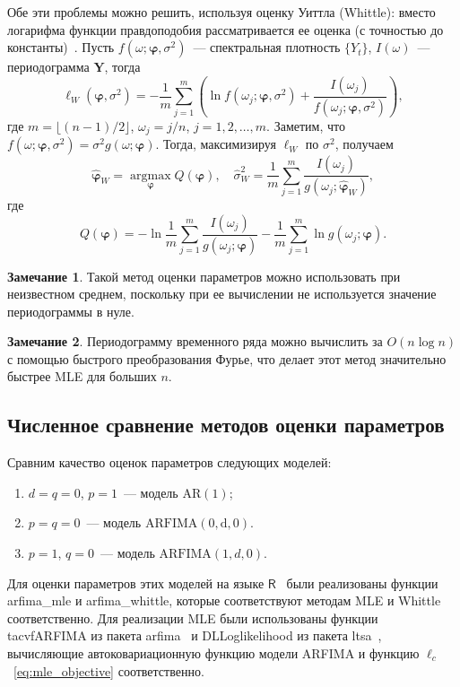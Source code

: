 \documentclass[specialist,
substylefile = spbu_report.rtx,
subf,href,colorlinks=true, 12pt]{disser}
\theoremstyle{definition}
\newtheorem{remark}{Замечание}[chapter]
\begin{document}
Обе эти проблемы можно решить, используя оценку Уиттла (Whittle): вместо логарифма функции правдоподобия рассматривается ее оценка (с точностью до константы)~\cite{Whittle1953}. Пусть $f(\omega; \bm\varphi, \sigma^2)$~--- спектральная плотность $\{Y_t\}$, $I(\omega)$~--- периодограмма $\bm Y$, тогда
\[
	\ell_W(\bm\varphi, \sigma^2)=-\frac1m\sum_{j=1}^m\left(\ln f(\omega_j; \bm\varphi, \sigma^2) + \frac{I(\omega_j)}{f(\omega_j; \bm\varphi, \sigma^2)}\right),
\]
где $m=\lfloor(n-1)/2\rfloor$, $\omega_j = j / n$, $j=1,2,\ldots,m$. Заметим, что $f(\omega; \bm\varphi, \sigma^2)=\sigma^2 g(\omega; \bm\varphi)$. Тогда, максимизируя $\ell_W$ по $\sigma^2$, получаем
\[
	\widehat{\bm\varphi}_W = \operatorname*{argmax}_{\bm\varphi}Q(\bm\varphi),\quad \widehat\sigma_W^2=\frac1m \sum_{j=1}^m\frac{I(\omega_j)}{g(\omega_j; \widehat{\bm\varphi}_W)},
\]
где
\[
	Q(\bm\varphi)=-\ln\frac1m \sum_{j=1}^m\frac{I(\omega_j)}{g(\omega_j; \bm\varphi)} - \frac1m \sum_{j=1}^m\ln g(\omega_j; \bm\varphi).
\]
\begin{remark}
	Такой метод оценки параметров можно использовать при неизвестном среднем, поскольку при ее вычислении не используется значение периодограммы в нуле.
\end{remark}
\begin{remark}
	Периодограмму временного ряда можно вычислить за $O(n\log n)$ с помощью быстрого преобразования Фурье, что делает этот метод значительно быстрее MLE для больших $n$.
\end{remark}
\subsection{Численное сравнение методов оценки параметров}\label{sect:est_param}
Сравним качество оценок параметров следующих моделей:
\begin{enumerate}
	\item $d=q=0$, $p=1$~--- модель $\mathrm{AR}(1)$;
	\item $p=q=0$~--- модель $\mathrm{ARFIMA(0, d, 0)}$.
	\item $p=1$, $q=0$~--- модель $\mathrm{ARFIMA}(1, d, 0)$.
\end{enumerate}
Для оценки параметров этих моделей на языке $\mathsf{R}$~\cite{R} были реализованы функции \textsf{arfima\_mle} и \textsf{arfima\_whittle}, которые соответствуют методам MLE и Whittle соответственно. Для реализации MLE были использованы функции \textsf{tacvfARFIMA} из пакета \textsf{arfima}~\cite{Veenstra2012} и \textsf{DLLoglikelihood} из пакета \textsf{ltsa}~\cite{McLeod2007}, вычисляющие автоковариационную функцию модели ARFIMA и функцию $\ell_c$~\eqref{eq:mle_objective} соответственно.
\end{document}
